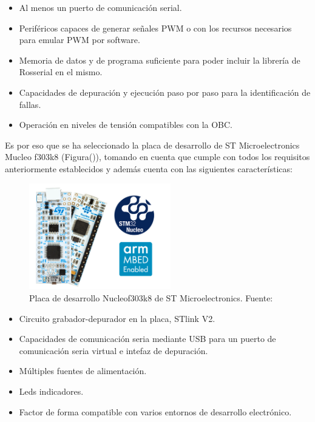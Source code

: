     \begin{itemize}
        \item Al menos un puerto de comunicación serial.
        \item Periféricos capaces de generar señales PWM o con los recursos necesarios para emular PWM por software.
        \item Memoria de datos y de programa suficiente para poder incluir la librería de Rosserial en el mismo.
        \item Capacidades de depuración y ejecución paso por paso para la identificación de fallas.
        \item Operación en niveles de tensión compatibles con la OBC.
    \end{itemize}

    Es por eso que se ha seleccionado la placa de desarrollo de ST Microelectronics Mucleo f303k8 (Figura()), tomando en cuenta 
    que cumple con todos los requisitos anteriormente establecidos y además cuenta con las siguientes características:


    \begin{figure}[!h] 
        \centering
        \includegraphics[width=0.55\textwidth]{img/nucleo}
        \caption[Placa de desarrollo Nucleof303k8 de ST Microelectronics]{Placa de desarrollo Nucleof303k8 de ST Microelectronics. Fuente: \cite{nucleof303} }
        \label{fig:nucleo}
    \end{figure}


    \begin{itemize}
        \item Circuito grabador-depurador en la placa, STlink V2.
        \item Capacidades de comunicación seria mediante USB para un puerto de comunicación seria virtual e intefaz de depuración.
        \item Múltiples fuentes de alimentación.
        \item Leds indicadores.
        \item Factor de forma compatible con varios entornos de desarrollo electrónico.
    \end{itemize}


